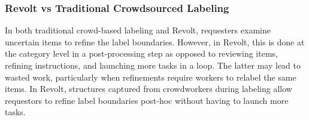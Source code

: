 
\subsubsection{Revolt vs Traditional Crowdsourced Labeling} 


In both traditional crowd-based labeling and Revolt, requesters examine uncertain items to refine the label boundaries. However, in Revolt, this is done at the category level in a post-processing step as opposed to reviewing items, refining instructions, and launching more tasks in a loop. The latter may lead to wasted work, particularly when refinements require workers to relabel the same items. In Revolt, structures captured from crowdworkers during labeling allow requestors to refine label boundaries post-hoc without having to launch more tasks.

